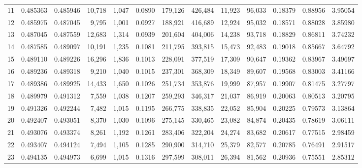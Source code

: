 \begin{tabular}{rrrrrrrrrrrrr}
11 &  0.485363 &  0.485946 &  10,718 &  1,047 &                                     0.0890 &  179,126 &  426,484 &   11,923 &   96,033 &  0.18379 &  0.88956 &  3.95054 \\
12 &  0.485975 &  0.487045 &   9,795 &  1,001 &                                     0.0927 &  188,921 &  416,689 &   12,924 &   95,032 &  0.18571 &  0.88028 &  3.85980 \\
13 &  0.487045 &  0.487559 &  12,683 &  1,314 &                                     0.0939 &  201,604 &  404,006 &   14,238 &   93,718 &  0.18829 &  0.86811 &  3.74232 \\
14 &  0.487585 &  0.489097 &  10,191 &  1,235 &                                     0.1081 &  211,795 &  393,815 &   15,473 &   92,483 &  0.19018 &  0.85667 &  3.64792 \\
15 &  0.489110 &  0.489226 &  16,296 &  1,836 &                                     0.1013 &  228,091 &  377,519 &   17,309 &   90,647 &  0.19362 &  0.83967 &  3.49697 \\
16 &  0.489236 &  0.489318 &   9,210 &  1,040 &                                     0.1015 &  237,301 &  368,309 &   18,349 &   89,607 &  0.19568 &  0.83003 &  3.41166 \\
17 &  0.489386 &  0.489925 &  14,433 &  1,650 &                                     0.1026 &  251,734 &  353,876 &   19,999 &   87,957 &  0.19907 &  0.81475 &  3.27797 \\
18 &  0.489979 &  0.491312 &   7,559 &  1,038 &                                     0.1207 &  259,293 &  346,317 &   21,037 &   86,919 &  0.20063 &  0.80513 &  3.20795 \\
19 &  0.491326 &  0.492244 &   7,482 &  1,015 &                                     0.1195 &  266,775 &  338,835 &   22,052 &   85,904 &  0.20225 &  0.79573 &  3.13864 \\
20 &  0.492407 &  0.493051 &   8,370 &  1,030 &                                     0.1096 &  275,145 &  330,465 &   23,082 &   84,874 &  0.20435 &  0.78619 &  3.06111 \\
21 &  0.493076 &  0.493374 &   8,261 &  1,192 &                                     0.1261 &  283,406 &  322,204 &   24,274 &   83,682 &  0.20617 &  0.77515 &  2.98459 \\
22 &  0.493407 &  0.494124 &   7,494 &  1,105 &                                     0.1285 &  290,900 &  314,710 &   25,379 &   82,577 &  0.20785 &  0.76491 &  2.91517 \\
23 &  0.494135 &  0.494973 &   6,699 &  1,015 &                                     0.1316 &  297,599 &  308,011 &   26,394 &   81,562 &  0.20936 &  0.75551 &  2.85312 \\

\end{tabular}

